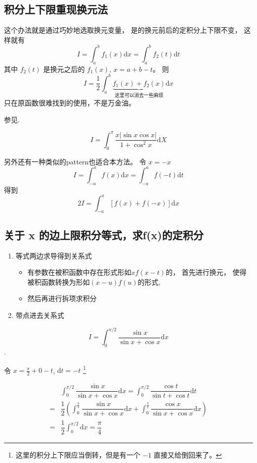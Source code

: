 \subsection{积分上下限重现换元法}

这个办法就是通过巧妙地选取换元变量，
是的换元前后的定积分上下限不变，
这样就有
\[
    I = \int_a^b f_1(x) \mathrm{d}x = \int_a^b f_2(t) \mathrm{d}t
\]
其中 $f_2(t)$ 是换元之后的 $f_1(x)$, $x = a + b - t$。
则
\[
    I = \dfrac{1}{2} \int_a^b 
    \underbrace{f_1(x) + f_2(x)}_{{\mbox{这里可以消去一些麻烦}}}
    \mathrm{d}x
\]
只在原函数很难找到的使用，不是万金油。

参见\cite[page 110, pdf 121, example 8]{we}.

\begin{example}
    \[
        I = \int_0^{\pi} \dfrac{x |\sin x \cos x|}{1+\cos^2 x} \mathrm{d}X
    \]
    \cite[question 64]{w660}
\end{example}

另外还有一种类似的pattern也适合本方法。
令 $x = -x$
\[
    I = \int_{-a}^{a} f(x) \mathrm{d}x = \int_{-a}^{a} f(-t) \mathrm{d}t
\]
得到
\[
    2I = \int_{-a}^{a} \left[f(x) + f(-x)\right] \mathrm{d}x
\]

\subsection{关于 x 的边上限积分等式，求f(x)的定积分}
\begin{enumerate}
    \item 等式两边求导得到关系式
        \begin{itemize}
            \item 有参数在被积函数中存在形式形如$xf(x - t)$的，
                  首先进行换元，
                  使得被积函数转换为形如$(x - u)f(u)$的形式,
            \item 然后再进行拆项求积分
        \end{itemize}
    \item 带点进去关系式
\end{enumerate}

\begin{example}
    \[
        I = \int _0^{\pi/2} \dfrac{\sin x}{\sin x + \cos x} \mathrm{d}x 
    \]
    \cite[page 111, pdf 122, example 10]{we}.

    令 $x = \frac{\pi}{2} + 0 - t$, $\mathrm{d}t = -t$
    \footnote{这里的积分上下限应当倒转，但是有一个 $-1$ 直接又给倒回来了。}

    \begin{align*}
        &\int_0^{\pi/2} \dfrac{\sin x}{\sin x + \cos x} \mathrm{d}x 
        = \int_0^{\pi/2} \dfrac{\cos t}{\sin t + \cos t} \mathrm{d}t \\ 
        = &\dfrac{1}{2} 
        \left(
            \int_0^{\frac{\pi}{2}} 
            \dfrac{\sin x}{\sin x + \cos x} \mathrm{d}x 
            + \int_0^{\frac{\pi}{2}} 
            \dfrac{\cos x}{\sin x + \cos x} \mathrm{d}x
        \right) \\
        = &\dfrac{1}{2} \int_0^{\pi/2} \mathrm{d}x = \dfrac{\pi}{4}
    \end{align*}
\end{example}

